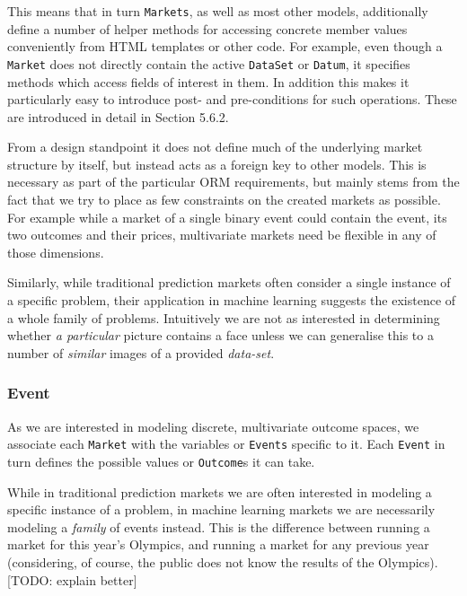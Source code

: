 \documentclass[bsc,frontabs,twoside,singlespacing,parskip,deptreport]{infthesis}     %
\begin{document}
	This means that in turn {\tt Markets}, as well as most other models, additionally define a number of helper methods for accessing concrete member values conveniently from HTML templates or other code. For example, even though a {\tt Market} does not directly contain the active {\tt DataSet} or {\tt Datum}, it specifies methods which access fields of interest in them. In addition this makes it particularly easy to introduce post- and pre-conditions for such operations. These are introduced in detail in Section 5.6.2. 
    
    From a design standpoint it does not define much of the underlying market structure by itself, but instead acts as a foreign key to other models. This is necessary as part of the particular ORM requirements, but mainly stems from the fact that we try to place as few constraints on the created markets as possible. For example while a market of a single binary event could contain the event, its two outcomes and their prices, multivariate markets need be flexible in any of those dimensions. 

    Similarly, while traditional prediction markets often consider a single instance of a specific problem, their application in machine learning suggests the existence of a whole family of problems. Intuitively we are not as interested in determining whether {\em a particular} picture contains a face unless we can generalise this to a number of {\em similar} images of a provided {\em data-set}. 
    
    
\subsubsection{Event}
    As we are interested in modeling discrete, multivariate outcome spaces, we associate each {\tt Market} with the variables or {\tt Events} specific to it. Each {\tt Event} in turn defines the possible values or {\tt Outcome}s it can take. 

    

    While in traditional prediction markets we are often interested in modeling a specific instance of a problem, in machine learning markets we are necessarily modeling a {\em family} of events instead. This is the difference between running a market for this year’s Olympics, and running a market for any previous year (considering, of course, the public does not know the results of the Olympics). [TODO: explain better]
\end{document}
